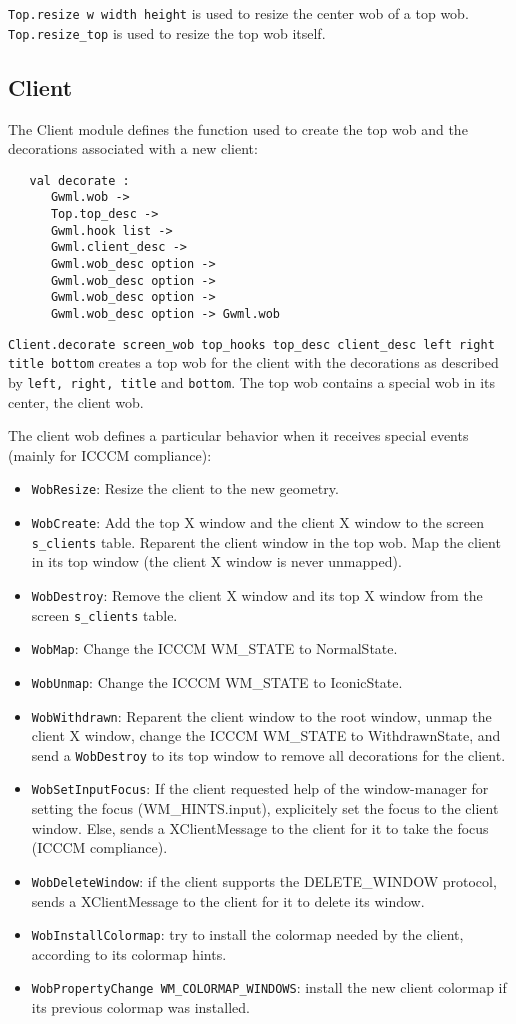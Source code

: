 \documentclass{book}
\begin{document}
  {\tt Top.resize w width height} is used to resize the center wob of a 
top wob. {\tt Top.resize\_top} is used to resize the top wob itself.
 
\subsection{\bf Client}

  The Client module defines the function used to create the top wob and 
the decorations associated with a new client:

\begin{verbatim}
   val decorate :
      Gwml.wob ->
      Top.top_desc ->
      Gwml.hook list ->
      Gwml.client_desc ->
      Gwml.wob_desc option ->
      Gwml.wob_desc option ->
      Gwml.wob_desc option -> 
      Gwml.wob_desc option -> Gwml.wob
\end{verbatim}
  {\tt Client.decorate screen\_wob top\_hooks top\_desc client\_desc
  left right title bottom} creates a top wob for the client with
  the decorations as described by {\tt left, right, title} and {\tt bottom}.
  The top wob contains a special wob in its center, the client wob.

  The client wob defines a particular behavior when it receives special events
(mainly for ICCCM compliance):
\begin{itemize}
\item {\tt WobResize}: Resize the client to the new geometry.
\item {\tt WobCreate}: Add the top X window and the client X window to
  the screen {\tt s\_clients} table. Reparent the client window in the top
  wob. Map the client in its top window (the client X window is never unmapped).
\item {\tt WobDestroy}: Remove the client X window and its top X window from
  the screen {\tt s\_clients} table.
\item {\tt WobMap}: Change the ICCCM WM\_STATE to NormalState.
\item {\tt WobUnmap}: Change the ICCCM WM\_STATE to IconicState.
\item {\tt WobWithdrawn}: Reparent the client window to the root window,
  unmap the client X window, change the ICCCM WM\_STATE to WithdrawnState, and
  send a {\tt WobDestroy} to its top window to remove all decorations for 
  the client.
\item {\tt WobSetInputFocus}: If the client requested help of the 
window-manager for setting the focus (WM\_HINTS.input), explicitely set the
focus to the client window. Else, sends a XClientMessage to the client for it
to take the focus (ICCCM compliance).
\item {\tt WobDeleteWindow}: if the client supports the DELETE\_WINDOW 
protocol, sends a XClientMessage to the client for it to delete its window.
\item {\tt WobInstallColormap}: try to install the colormap needed by the client,
according to its colormap hints.
\item {\tt WobPropertyChange WM\_COLORMAP\_WINDOWS}: install the new 
client colormap if its previous colormap was installed.
\end{itemize}
\end{document}
